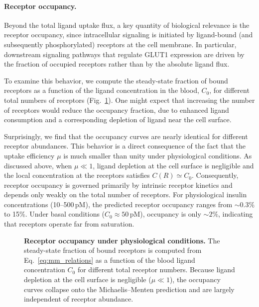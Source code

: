 \paragraph{Receptor occupancy.}
Beyond the total ligand uptake flux, a key quantity of biological relevance is the receptor occupancy, since intracellular signaling is initiated by ligand-bound (and subsequently phosphorylated) receptors at the cell membrane.
In particular, downstream signaling pathways that regulate GLUT1 expression are driven by the fraction of occupied receptors rather than by the absolute ligand flux.

To examine this behavior, we compute the steady-state fraction of bound receptors as a function of the ligand concentration in the blood, $C_{0}$, for different total numbers of receptors (Fig.~\ref{fig:occupancy}).
One might expect that increasing the number of receptors would reduce the occupancy fraction, due to enhanced ligand consumption and a corresponding depletion of ligand near the cell surface.

Surprisingly, we find that the occupancy curves are nearly identical for different receptor abundances.
This behavior is a direct consequence of the fact that the uptake efficiency $\mu$ is much smaller than unity under physiological conditions.
As discussed above, when $\mu \ll 1$, ligand depletion at the cell surface is negligible and the local concentration at the receptors satisfies $C(R) \simeq C_{0}$.
Consequently, receptor occupancy is governed primarily by intrinsic receptor kinetics and depends only weakly on the total number of receptors.
For physiological insulin concentrations (10--500\,pM), the predicted receptor occupancy ranges from $\sim 0.3\%$ to 15\%.
Under basal conditions ($C_{0} \approx 50\,\mathrm{pM}$), occupancy is only $\sim 2\%$, indicating that receptors operate far from saturation.

\begin{figure}[H]
    \centering
    \caption{\textbf{Receptor occupancy under physiological conditions.} The steady-state fraction of bound receptors is computed from Eq.~\eqref{eq:mm_relations} as a function of the blood ligand concentration $C_{0}$ for different total receptor numbers. Because ligand depletion at the cell surface is negligible ($\mu \ll 1$), the occupancy curves collapse onto the Michaelis--Menten prediction and are largely independent of receptor abundance.}
    \label{fig:occupancy}
\end{figure}
